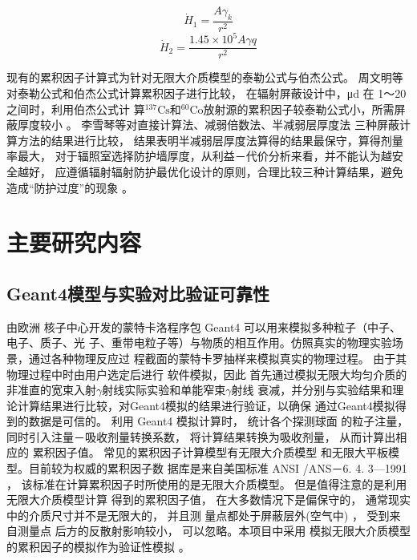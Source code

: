\begin{equation}
    \dot{H}_1=\frac{A\gamma _k}{r^2} \label{h1}
\end{equation}
\begin{equation}
    \dot{H}_2=\frac{1.45 \times 10^5A\gamma q}{r^2} \label{h2}
\end{equation}

现有的累积因子计算式为针对无限大介质模型的泰勒公式与伯杰公式。
周文明等对泰勒公式和伯杰公式计算累积因子进行比较，
在辐射屏蔽设计中，μd 在 1～20 之间时，利用伯杰公式计
算$^{137}\mathrm{Cs}$和$^{60}\mathrm{Co}$放射源的累积因子较泰勒公式小，所需屏蔽厚度较小
\cite{周文明2017两种不同经验公式法计算累积因子的比较}。
李雪琴等对直接计算法、减弱倍数法、半减弱层厚度法
三种屏蔽计算方法的结果进行比较，
结果表明半减弱层厚度法算得的结果最保守，算得剂量率最大，
对于辐照室选择防护墙厚度，从利益－代价分析来看，并不能认为越安全越好，
应遵循辐射辐射防护最优化设计的原则，合理比较三种计算结果，避免造成“防护过度”的现象
\cite{李雪琴2013辐照装置屏蔽厚度计算的方法研究与评价}。
\section{主要研究内容}
\subsection{Geant4模型与实验对比验证可靠性}
由欧洲
核子中心开发的蒙特卡洛程序包 Geant4 可以用来模拟多种粒子（中子、电子、质子、光
子、重带电粒子等）与物质的相互作用。仿照真实的物理实验场景，通过各种物理反应过
程截面的蒙特卡罗抽样来模拟真实的物理过程。 由于其物理过程中时由用户选定后进行
软件模拟，因此
首先通过模拟无限大均匀介质的非准直的宽束入射$\gamma$射线实际实验和单能窄束$\gamma$射线
衰减，并分别与实验结果和理论计算结果进行比较，对Geant4模拟的结果进行验证，以确保
通过Geant4模拟得到的数据是可信的。
利用 Geant4 模拟计算时， 统计各个探测球面
的粒子注量， 同时引入注量－吸收剂量转换系数，
将计算结果转换为吸收剂量， 从而计算出相应的
累积因子值。
常见的累积因子计算模型有无限大介质模型
和无限大平板模型。目前较为权威的累积因子数
据库是来自美国标准 ANSI /ANS－6. 4. 3—1991
\cite{785656}，
该标准在计算累积因子时所使用的是无限大介质模型。
但是值得注意的是利用无限大介质模型计算
得到的累积因子值， 在大多数情况下是偏保守的，
通常现实中的介质尺寸并不是无限大的， 并且测
量点都处于屏蔽层外(空气中) ， 受到来自测量点
后方的反散射影响较小， 可以忽略。本项目中采用
模拟无限大介质模型的累积因子的模拟作为验证性模拟
\cite{中国科学院工程力学研究所1977γ射线屏蔽参数手册}。
